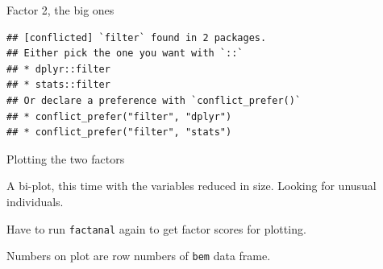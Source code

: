 \documentclass[ignorenonframetext,]{beamer}
\newenvironment{Shaded}{\begin{snugshade}}{\end{snugshade}}
\newcommand{\DataTypeTok}[1]{\textcolor[rgb]{0.13,0.29,0.53}{#1}}
\newcommand{\DecValTok}[1]{\textcolor[rgb]{0.00,0.00,0.81}{#1}}
\newcommand{\FloatTok}[1]{\textcolor[rgb]{0.00,0.00,0.81}{#1}}
\newcommand{\KeywordTok}[1]{\textcolor[rgb]{0.13,0.29,0.53}{\textbf{#1}}}
\newcommand{\NormalTok}[1]{#1}
\newcommand{\OperatorTok}[1]{\textcolor[rgb]{0.81,0.36,0.00}{\textbf{#1}}}
\newcommand{\StringTok}[1]{\textcolor[rgb]{0.31,0.60,0.02}{#1}}
\begin{document}
\begin{frame}[fragile]{Factor 2, the big ones}
\protect\hypertarget{factor-2-the-big-ones}{}

\begin{Shaded}
\end{Shaded}

\begin{verbatim}
## [conflicted] `filter` found in 2 packages.
## Either pick the one you want with `::` 
## * dplyr::filter
## * stats::filter
## Or declare a preference with `conflict_prefer()`
## * conflict_prefer("filter", "dplyr")
## * conflict_prefer("filter", "stats")
\end{verbatim}

\end{frame}

\begin{frame}[fragile]{Plotting the two factors}
\protect\hypertarget{plotting-the-two-factors}{}

A bi-plot, this time with the variables reduced in size. Looking for
unusual individuals.

Have to run \texttt{factanal} again to get factor scores for plotting.

\begin{Shaded}
\end{Shaded}

Numbers on plot are row numbers of \texttt{bem} data frame.

\end{frame}
\end{document}
